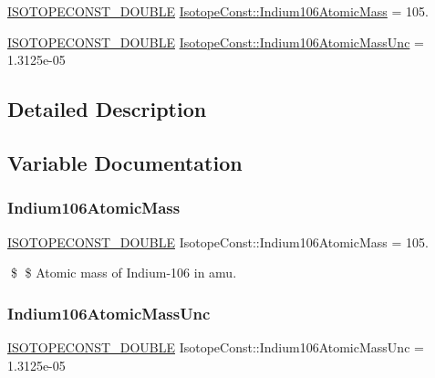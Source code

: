 \begin{DoxyCompactItemize}
\item 
\mbox{\hyperlink{group___isotope_const-_macros_ga8f45a7272ce02c0b4c65c44636ed719a}{I\+S\+O\+T\+O\+P\+E\+C\+O\+N\+S\+T\+\_\+\+D\+O\+U\+B\+LE}} \mbox{\hyperlink{group___isotope_const-_indium-_in106_ga300786bb89e70297caf24f261844e026}{Isotope\+Const\+::\+Indium106\+Atomic\+Mass}} = 105.
\item 
\mbox{\hyperlink{group___isotope_const-_macros_ga8f45a7272ce02c0b4c65c44636ed719a}{I\+S\+O\+T\+O\+P\+E\+C\+O\+N\+S\+T\+\_\+\+D\+O\+U\+B\+LE}} \mbox{\hyperlink{group___isotope_const-_indium-_in106_gaa63b29256b253b1443187c759fea8fb0}{Isotope\+Const\+::\+Indium106\+Atomic\+Mass\+Unc}} = 1.\+3125e-\/05
\end{DoxyCompactItemize}


\subsection{Detailed Description}


\subsection{Variable Documentation}
\mbox{\label{group___isotope_const-_indium-_in106_ga300786bb89e70297caf24f261844e026}} 
\subsubsection{\texorpdfstring{Indium106\+Atomic\+Mass}{Indium106AtomicMass}}
{\footnotesize\ttfamily \mbox{\hyperlink{group___isotope_const-_macros_ga8f45a7272ce02c0b4c65c44636ed719a}{I\+S\+O\+T\+O\+P\+E\+C\+O\+N\+S\+T\+\_\+\+D\+O\+U\+B\+LE}} Isotope\+Const\+::\+Indium106\+Atomic\+Mass = 105.}

\$ \$ Atomic mass of Indium-\/106 in amu. \mbox{\label{group___isotope_const-_indium-_in106_gaa63b29256b253b1443187c759fea8fb0}} 
\subsubsection{\texorpdfstring{Indium106\+Atomic\+Mass\+Unc}{Indium106AtomicMassUnc}}
{\footnotesize\ttfamily \mbox{\hyperlink{group___isotope_const-_macros_ga8f45a7272ce02c0b4c65c44636ed719a}{I\+S\+O\+T\+O\+P\+E\+C\+O\+N\+S\+T\+\_\+\+D\+O\+U\+B\+LE}} Isotope\+Const\+::\+Indium106\+Atomic\+Mass\+Unc = 1.\+3125e-\/05}

